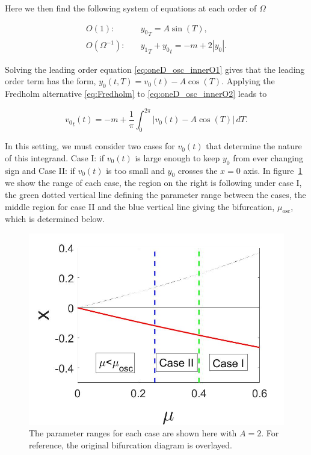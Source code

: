 Here we then find the following system of equations at each order of $\Omega$

\begin{align}
\label{eq:oneD_osc_innerO1}
O(1):\quad & {y_0}_T = A\sin(T),\\
\label{eq:oneD_osc_innerO2}
O(\Omega^{-1}):\quad & {y_1}_T+{y_0}_t = -m+2|y_0|.
\end{align}

Solving the leading order equation \eqref{eq:oneD_osc_innerO1} gives that the leading order term has the form, $y_0(t,T)=v_0(t)-A\cos(T)$. Applying the Fredholm alternative \eqref{eq:Fredholm} to \eqref{eq:oneD_osc_innerO2} leads to

\begin{equation}\label{eq:oneD_osc_integral}
{v_0}_t(t)=-m+\frac{1}{\pi}\int_0^{2\pi} |v_0(t)-A\cos(T)|\,dT.
\end{equation}

\indent In this setting, we must consider two cases for $v_0(t)$ that determine the nature of this integrand. Case I: if $v_0(t)$ is large enough to keep $y_0$ from ever changing sign and Case II: if $v_0(t)$ is too small and $y_0$ crosses the $x=0$ axis. In figure~\ref{fig:oneD_osc_cases} we show the range of each case, the region on the right is following under case I, the green dotted vertical line defining the parameter range between the cases, the middle region for case II and the blue vertical line giving the bifurcation, $\mu_{\text{osc}}$, which is determined below.

\begin{figure}[H]
\centering
\includegraphics[width=.7\textwidth]{oneD/osc_cases.jpg}
\caption{The parameter ranges for each case are shown here with $A=2$. For reference, the original bifurcation diagram is overlayed.}
\label{fig:oneD_osc_cases}
\end{figure}

